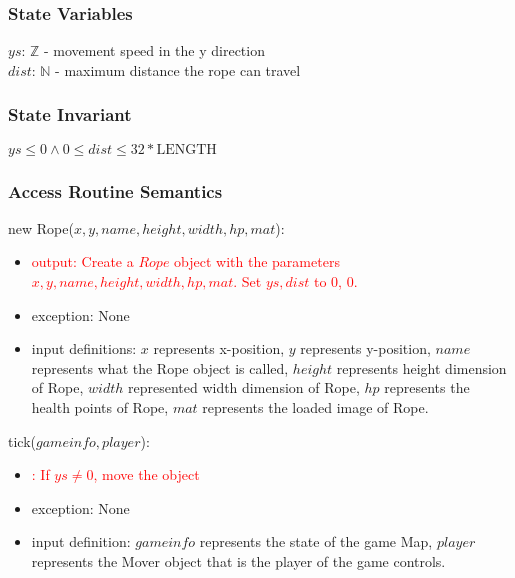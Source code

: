 \documentclass[12pt]{article}
\newcommand{\Implies}{\Rightarrow}
\newcommand{\m}[1]{\mbox{#1}}
\begin{document}
\subsubsection*{State Variables}

$ys$: $\mathbb{Z}$ - movement speed in the y direction\\
$dist$: $\mathbb{N}$ - maximum distance the rope can travel

\subsubsection*{State Invariant}

$ys \leq 0 \land 0 \leq dist \leq 32 * \text{LENGTH}$

\subsubsection*{Access Routine Semantics}

new Rope($x, y, name, height, width, hp, mat$):
\begin{itemize}
    \item \textcolor{red}{output: Create a $Rope$ object with the parameters $x, y, name, height, width, hp, mat$. Set $ys, dist$ to 0, 0.}
    \item exception: None
    \item input definitions: $x$ represents x-position, $y$ represents y-position, $name$ represents what the Rope object is called, $height$ represents height dimension of Rope, $width$ represented width dimension of Rope, $hp$ represents the health points of Rope, $mat$ represents the loaded image of Rope.
\end{itemize}

\noindent tick($gameinfo, player$):
\begin{itemize}
    \item \textcolor{red}{: If $ys \neq 0$, move the object}
    \item exception: None
    \item input definition: $gameinfo$ represents the state of the game Map, $player$ represents the Mover object that is the player of the game controls.
\end{itemize}
\end{document}
